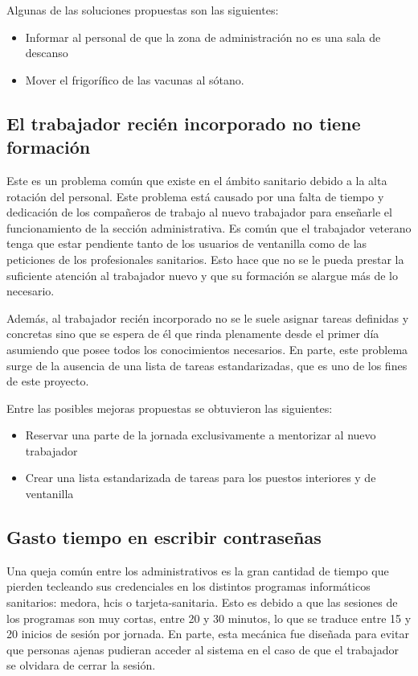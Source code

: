 Algunas de las soluciones propuestas son las siguientes:

\begin{itemize}
    \item Informar al personal de que la zona de administración no es una sala de descanso
    \item Mover el frigorífico de las vacunas al sótano.
\end{itemize}

\subsection{El trabajador recién incorporado no tiene formación}

Este es un problema común que existe en el ámbito sanitario debido a la alta rotación del personal.
Este problema está causado por una falta de tiempo y dedicación de los compañeros de trabajo al nuevo trabajador para enseñarle el funcionamiento de la sección administrativa. Es común que el trabajador veterano tenga que estar pendiente tanto de los usuarios de ventanilla como de las peticiones de los profesionales sanitarios. Esto hace que no se le pueda prestar la suficiente atención al trabajador nuevo y que su formación se alargue más de lo necesario.

Además, al trabajador recién incorporado no se le suele asignar tareas definidas y concretas sino que se espera de él que rinda plenamente desde el primer día asumiendo que posee todos los conocimientos necesarios. En parte, este problema surge de la ausencia de una lista de tareas estandarizadas, que es uno de los fines de este proyecto.

Entre las posibles mejoras propuestas se obtuvieron las siguientes:

\begin{itemize}
    \item Reservar una parte de la jornada exclusivamente a mentorizar al nuevo trabajador
    \item Crear una lista estandarizada de tareas para los puestos interiores y de ventanilla
\end{itemize}

\subsection{Gasto tiempo en escribir contraseñas}

Una queja común entre los administrativos es la gran cantidad de tiempo que pierden tecleando sus credenciales en los distintos programas informáticos sanitarios: \Gls{medora}, \Gls{hcis} o \Gls{tarjeta-sanitaria}.
Esto es debido a que las sesiones de los programas son muy cortas, entre 20 y 30 minutos, lo que se traduce entre 15 y 20 inicios de sesión por jornada.
En parte, esta mecánica fue diseñada para evitar que personas ajenas pudieran acceder al sistema en el caso de que el trabajador se olvidara de cerrar la sesión.

